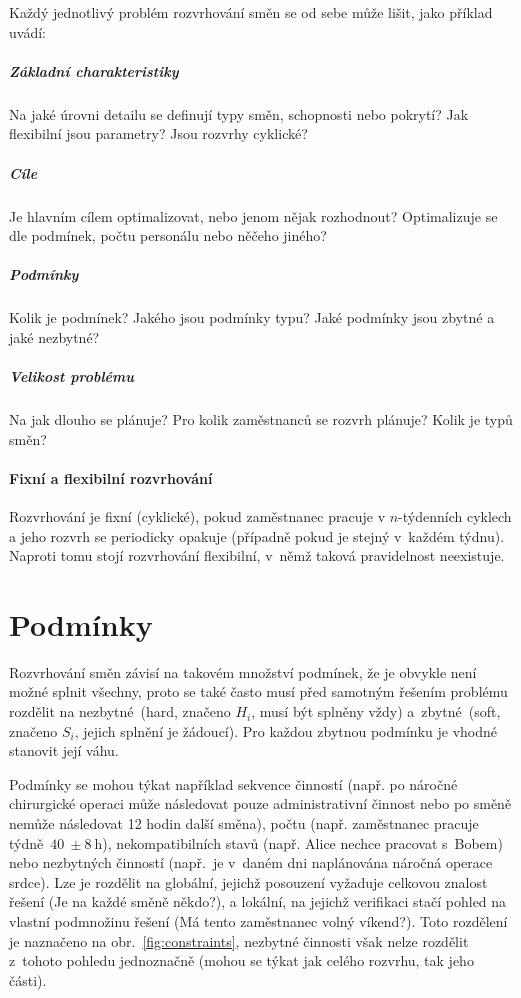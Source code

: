 \documentclass[twoside]{ctuthesis}
\begin{document}
Každý jednotlivý problém rozvrhování směn se od sebe může lišit, \cite{de2011categorisation} jako příklad uvádí:

\subparagraph{Základní charakteristiky}
Na jaké úrovni detailu se definují typy směn, schopnosti nebo pokrytí? Jak flexibilní jsou parametry? Jsou rozvrhy cyklické?

\subparagraph{Cíle}
Je hlavním cílem optimalizovat, nebo jenom nějak rozhodnout? Optimalizuje se dle podmínek, počtu personálu nebo něčeho jiného?

\subparagraph{Podmínky}
Kolik je podmínek? Jakého jsou podmínky typu? Jaké podmínky jsou zbytné a jaké nezbytné?

\subparagraph{Velikost problému}
Na jak dlouho se plánuje? Pro kolik zaměstnanců se rozvrh plánuje? Kolik je typů směn?

\paragraph{Fixní a flexibilní rozvrhování}
Rozvrhování je fixní (cyklické), pokud zaměstnanec pracuje v $n$-týdenních cyklech a jeho rozvrh se periodicky opakuje (případně pokud je stejný v~každém týdnu). Naproti tomu stojí rozvrhování flexibilní, v~němž taková pravidelnost neexistuje. \cite{burke2004state}


\section{Podmínky}
\label{sec:constraints}
Rozvrhování směn závisí na takovém množství podmínek, že je obvykle není možné splnit všechny, proto se také často musí před samotným řešením problému rozdělit na nezbytné~(hard, značeno $H_i$, musí být splněny vždy) a~zbytné~(soft, značeno $S_i$, jejich splnění je žádoucí). \cite{todorovic2012bee} Pro každou zbytnou podmínku je vhodné stanovit její váhu. \cite{buyukozkan2014applicability}

Podmínky se mohou týkat například sekvence činností (např. po náročné chirurgické operaci může následovat pouze administrativní činnost nebo po směně nemůže následovat 12 hodin další směna), počtu (např. zaměstnanec pracuje týdně~$ 40~\pm 8~\mbox{h}$), nekompatibilních stavů (např. Alice nechce pracovat s~Bobem) nebo nezbytných činností (např.~je v~daném dni naplánována náročná operace srdce). Lze je rozdělit na globální, jejichž posouzení vyžaduje celkovou znalost řešení (Je na každé směně někdo?), a lokální, na jejichž verifikaci stačí pohled na vlastní podmnožinu řešení (Má tento zaměstnanec volný víkend?). Toto rozdělení je naznačeno na obr.~\ref{fig:constraints}, nezbytné činnosti však nelze rozdělit z~tohoto pohledu jednoznačně (mohou se týkat jak celého rozvrhu, tak jeho části). \cite{blochliger2004modeling}
\end{document}
